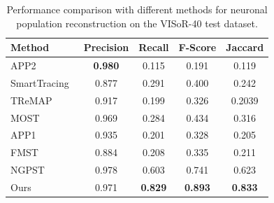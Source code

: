 \begin{table}[t]
	\centering
	\caption{Performance comparison with different methods for neuronal population reconstruction on the VISoR-40 test dataset.%
	}
	\label{table:compare_VISoR}
	\begin{tabular}{lcccc}
		\toprule
		Method & Precision & Recall & F-Score & Jaccard\\ 
		\midrule
		APP2~\cite{Xiao2013} & \textbf{0.980} & 0.115 & 0.191 & 0.119\\
		SmartTracing~\cite{Chen2015} & 0.877 & 0.291 & 0.400 & 0.242\\
		TReMAP~\cite{Zhou2016} & 0.917 & 0.199 & 0.326 & 0.2039\\
		MOST~\cite{Wu2014} & 0.969 & 0.284& 0.434& 0.316\\
		APP1~\cite{Peng2011} & 0.935 & 0.201 & 0.328 & 0.205\\
		FMST~\cite{Yang2019} & 0.884 & 0.208 & 0.335 &  0.211\\
		NGPST~\cite{Quan2015} & 0.978 & 0.603 & 0.741 & 0.623\\
		\midrule
		Ours & 0.971 & \textbf{0.829} & \textbf{0.893} & \textbf{0.833}\\
		\bottomrule
		\hline
	\end{tabular}
\end{table}



